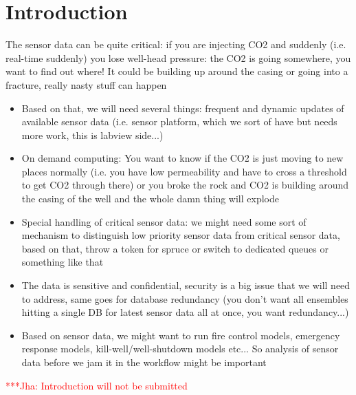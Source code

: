 \documentclass[conference,final]{IEEEtran}
\newcommand{\jhanote}[1]{ {\textcolor{red} { ***Jha: #1 }}}
\newcommand{\jhanote}[1]{}
\begin{document}
\section{Introduction}

The sensor data can be quite critical: if you are injecting CO2 and suddenly (i.e. real-time suddenly) you lose well-head pressure: the CO2 is going somewhere, you want to find out where! It could be building up around the casing or going into a fracture, really nasty stuff can happen
\begin{itemize}
 \item Based on that, we will need several things: frequent and dynamic updates of available sensor data (i.e. sensor platform, which we sort of have but needs more work, this is labview side...)
 \item On demand computing: You want to know if the CO2 is just moving to new places normally (i.e. you have low permeability and have to cross a threshold to get CO2 through there) or you broke the rock and CO2 is building around the casing of the well and the whole damn thing will explode
 \item Special handling of critical sensor data: we might need some sort of mechanism to distinguish low priority sensor data from critical sensor data, based on that, throw a token for spruce or switch to dedicated queues or something like that
 \item The data is sensitive and confidential, security is a big issue that we will need to address, same goes for database redundancy (you don't want all ensembles hitting a single DB for latest sensor data all at once, you want redundancy...)
\item Based on sensor data, we might want to run fire control models, emergency response models, kill-well/well-shutdown models etc... So analysis of sensor data before we jam it in the workflow might be important
\end{itemize}

\jhanote{Introduction will not be submitted}

 

\end{document}
